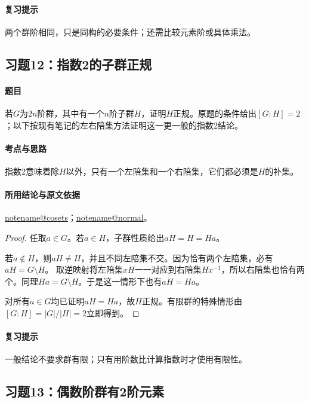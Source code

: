 \documentclass[UTF8,a4paper,11pt,fontset=windows]{ctexart}
\makeatletter
\newcommand{\noteref}[1]{\hyperref[note:#1]{\csname notename@#1\endcsname}}
\newcommand{\exref}[2]{\hyperref[ex:#1:#2]{第#1章习题#2}}
\makeatother
\begin{document}
\paragraph{复习提示}
两个群阶相同，只是同构的必要条件；还需比较元素阶或具体乘法。


\subsection{习题12：\texorpdfstring{指数2的子群正规}{指数2的子群正规}}
\label{ex:1:12}

\paragraph{题目}
若$G$为$2n$阶群，其中有一个$n$阶子群$H$，证明$H$正规。原题的条件给出$[G:H]=2$；以下按现有笔记的左右陪集方法证明这一更一般的指数2结论。

\paragraph{考点与思路}
指数2意味着除$H$以外，只有一个左陪集和一个右陪集，它们都必须是$H$的补集。

\paragraph{所用结论与原文依据}
\noteref{cosets}；\noteref{normal}。


\begin{proof}
任取$a\in G$。若$a\in H$，子群性质给出$aH=H=Ha$。

若$a\notin H$，则$aH\ne H$，并且不同左陪集不交。因为恰有两个左陪集，必有$aH=G\setminus H$。
取逆映射将左陪集$xH$一一对应到右陪集$Hx^{-1}$，所以右陪集也恰有两个。同理$Ha=G\setminus H$。于是这一情形下也有$aH=Ha$。

对所有$a\in G$均已证明$aH=Ha$，故$H$正规。有限群的特殊情形由$[G:H]=|G|/|H|=2$立即得到。
\end{proof}

\paragraph{复习提示}
一般结论不要求群有限；只有用阶数比计算指数时才使用有限性。


\subsection{习题13：\texorpdfstring{偶数阶群有2阶元素}{偶数阶群有2阶元素}}
\label{ex:1:13}
\end{document}
